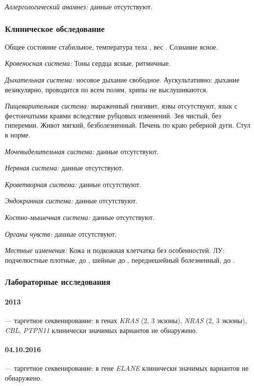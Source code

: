 \documentclass[a4paper,14pt]{extarticle}
\newcommand{\kilogramm}{кг}
\newcommand{\cm}{см}
\newcommand{\oCelsius}{\tcdegree{}C}
\newcommand{\genename}[1]{\textit{#1}}
\begin{document}
\emph{Аллергологический анамнез:} данные отсутствуют.

\subsubsection*{Клиническое обследование}

Общее состояние стабильное, температура тела \numprint[\oCelsius]{36.7}, вес \numprint[\kilogramm]{48}. Сознание ясное.

\emph{Кровеносная система:} Тоны сердца ясные, ритмичные.

\emph{Дыхательная система:} носовое дыхание свободное. Аускультативно: дыхание везикулярно, проводится по всем полям, хрипы не выслушиваются.

\emph{Пищеварительная система:} выраженный гингивит, язвы отсутствуют, язык с фестончатыми краями вследствие рубцовых изменений. Зев чистый, без гиперемии. Живот мягкий, безболезненный. Печень по краю реберной дуги. Стул в норме.

\emph{Мочевыделительная система:} данные отсутствуют.

\emph{Нервная система:}  данные отсутствуют.

\emph{Кроветворная система:} данные отсутствуют.

\emph{Эндокринная система:} данные отсутствуют.

\emph{Костно-мышечная система:} данные отсутствуют.

\emph{Органы чувств:} данные отсутствуют.

\emph{Местные изменения:} Кожа и подкожная клетчатка без особенностей. ЛУ: подчелюстные плотные, до \numprint[\cm]{1}, шейные до \numprint[\cm]{0.5}, переднешейный болезненный, до \numprint[\cm]{2}.

\subsubsection*{Лабораторные исследования}

\paragraph{2013} --- таргетное секвенирование: в генах \genename{KRAS} (2, 3 экзоны), \genename{NRAS} (2, 3 экзоны), \genename{CBL}, \genename{PTPN11} клинически значимых вариантов не обнаружено.

\paragraph{04.10.2016} --- таргетное секвенирование: в гене \genename{ELANE} клинически значимых вариантов не обнаружено.
\end{document}
